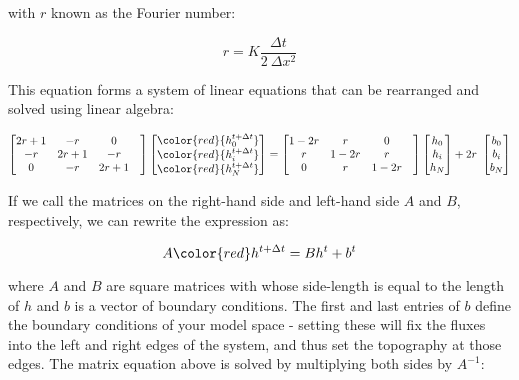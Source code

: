 \noindent with $r$ known as the Fourier number:


\begin{equation*}
	r=K\dfrac{\Delta t}{2~\Delta x^2}
	\tag{Fourier number}
\end{equation*}



\noindent This equation forms a system of linear equations that can be rearranged and solved using linear algebra:

\begin{equation}
	\begin{bmatrix}
		2r+1 & -r   & 0    & \\
		-r   & 2r+1 & -r   & \\
		0    & -r   & 2r+1 & \\
	\end{bmatrix}
	\begin{bmatrix}
		\color{red}{h_0^{t+\Delta t} } \\
		\color{red}{h_i^{t+\Delta t}}  \\
		\color{red}{h_N^{t+\Delta t}}  \\
	\end{bmatrix}
	=
	\begin{bmatrix}
		1-2r & r    & 0    & \\
		r    & 1-2r & r    & \\
		0    & r    & 1-2r & \\
	\end{bmatrix}
	\begin{bmatrix}
		h_0 \\
		h_i \\
		h_N \\
	\end{bmatrix}
	+
	2r~
	\begin{bmatrix}
		b_0 \\
		b_i \\
		b_N \\
	\end{bmatrix}
\end{equation}

\noindent If we call the matrices on the right-hand side and left-hand side $A$ and $B$, respectively, we can rewrite the expression as:

\begin{equation*}
	A
	{\color{red}h^{t+\Delta t} }
	=
	Bh^{t}
	+
	b^{t}
\end{equation*}

\noindent where $A$ and $B$ are square matrices with whose side-length is equal to the length of $h$ and $b$ is a vector of boundary conditions. The first and last entries of $b$ define the boundary conditions of your model space - setting these will fix the fluxes into the left and right edges of the system, and thus set the topography at those edges. The matrix equation above is solved by multiplying both sides by $A^{-1}$:

